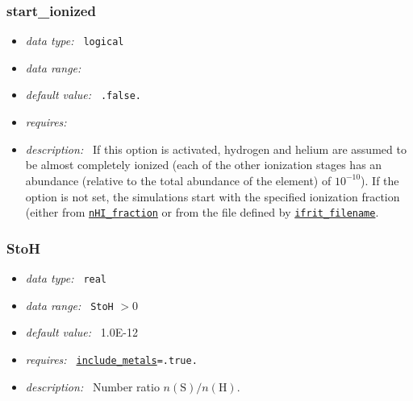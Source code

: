 \documentclass[a4paper,10pt]{article}
\begin{document}
\subsubsection{start\_ionized}
\label{opt:startionized}
\begin{itemize}
 \item \textit{data type:~} \texttt{logical}
 \item \textit{data range:~}
 \item \textit{default value:~} \texttt{.false.}
 \item \textit{requires:~}
 \item \textit{description:~} If this option is activated, hydrogen and helium 
  are assumed to be almost completely ionized (each of the other ionization 
  stages has an abundance (relative to the total abundance of the element) of 
  $10^{-10}$). If the option is not set, the   simulations start with the 
  specified ionization fraction (either from 
  \texttt{\hyperref[opt:nhifraction]{nHI\_fraction}} or from the file defined 
  by \texttt{\hyperref[opt:ifritfilename]{ifrit\_filename}}. 
\end{itemize}


\subsubsection{StoH}
\label{opt:stoh}
\begin{itemize}
 \item \textit{data type:~} \texttt{real}
 \item \textit{data range:~}  \texttt{StoH} $> 0$
 \item \textit{default value:~} 1.0E-12
 \item \textit{requires:~} \texttt{\hyperref[opt:abundreltoh]{include\_metals}=.true.}
 \item \textit{description:~} Number ratio $n(\mathrm{S})/n(\mathrm{H})$.
\end{itemize}
\end{document}
